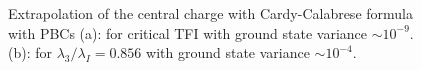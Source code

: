 	\begin{figure}[h!]
		\hspace{-0.9cm}
		\quad
		\caption{Extrapolation of the central charge with Cardy-Calabrese formula with PBCs (a): for critical TFI with ground state variance $\sim 10^{-9}$. (b): for $\lambda_3/\lambda_I = 0.856$ with ground state variance $\sim 10^{-4}$.}
		\label{fig:cPBCs}
	\end{figure}

